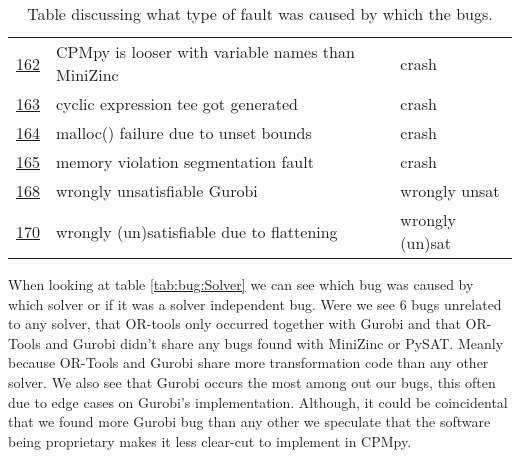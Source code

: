 \begin{table}[]
\begin{tabular}{lll}
		\href{https://github.com/CPMpy/cpmpy/issues/162}{162} & CPMpy is looser with variable names than MiniZinc & crash           \\
		\href{https://github.com/CPMpy/cpmpy/issues/163}{163} & cyclic expression tee got generated               & crash           \\
		\href{https://github.com/CPMpy/cpmpy/issues/164}{164} & malloc() failure due to unset bounds              & crash           \\
		\href{https://github.com/CPMpy/cpmpy/issues/165}{165} & memory violation segmentation fault               & crash           \\
		\href{https://github.com/CPMpy/cpmpy/issues/168}{168} & wrongly unsatisfiable Gurobi                      & wrongly unsat   \\
		\href{https://github.com/CPMpy/cpmpy/issues/170}{170} & wrongly (un)satisfiable due to flattening         & wrongly (un)sat \\ \bottomrule
	\end{tabular}
	\caption{Table discussing what type of fault was caused by which the bugs.}
	\label{tab:bug:fault}
\end{table}

When looking at table \ref{tab:bug:Solver} we can see which bug was caused by which solver or if it was a solver independent bug. Were we see 6 bugs unrelated to any solver, that OR-tools only occurred together with Gurobi and that OR-Tools and Gurobi didn't share any bugs found with MiniZinc or PySAT. Meanly because OR-Tools and Gurobi share more transformation code than any other solver. We also see that Gurobi occurs the most among out our bugs, this often due to edge cases on Gurobi's implementation. Although, it could be coincidental that we found more Gurobi bug than any other we speculate that the software being proprietary makes it less clear-cut to implement in CPMpy.

